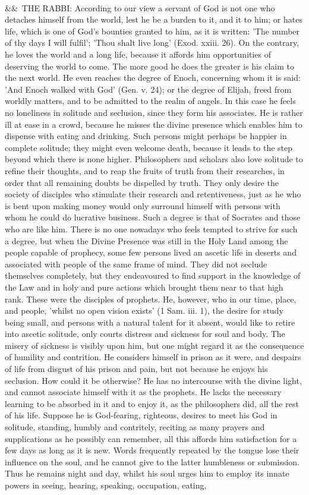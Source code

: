 \documentclass[12pt]{article}
\newcommand{\para}[1][]{\par\noindent\ifx&#1&\else\textsuperscript{\footnotesize #1}~\fi}
\begin{document}
\para THE RABBI: According to our view a servant of God is not one who detaches himself from the world, lest he be a burden to it, and it to him; or hates life, which is one of God's bounties granted to him, as it is written: 'The number of thy days I will fulfil'; 'Thou shalt live long' (Exod. xxiii. 26). On the contrary, he loves the world and a long life, because it affords him opportunities of deserving the world to come. The more good he does the greater is his claim to the next world. He even reaches the degree of Enoch, concerning whom it is said: 'And Enoch walked with God' (Gen. v. 24); or the degree of Elijah, freed from worldly matters, and to be admitted to the realm of angels. In this case he feels no loneliness in solitude and seclusion, since they form his associates. He is rather ill at ease in a crowd, because he misses the divine presence which enables him to dispense with eating and drinking. Such persons might perhaps be happier in complete solitude; they might even welcome death, because it leads to the step beyond which there is none higher. Philosophers and scholars also love solitude to refine their thoughts, and to reap the fruits of truth from their researches, in order that all remaining doubts be dispelled by truth. They only desire the society of disciples who stimulate their research and retentiveness, just as he who is bent upon making money would only surround himself with persons with whom he could do lucrative business. Such a degree is that of Socrates and those who are like him. There is no one nowadays who feels tempted to strive for such a degree, but when the Divine Presence was still in the Holy Land among the people capable of prophecy, some few persons lived an ascetic life in deserts and associated with people of the same frame of mind. They did not seclude themselves completely, but they endeavoured to find support in the knowledge of the Law and in holy and pure actions which brought them near to that high rank. These were the disciples of prophets. He, however, who in our time, place, and people, 'whilst no open vision exists' (1 Sam. iii. 1), the desire for study being small, and persons with a natural talent for it absent, would like to retire into ascetic solitude, only courts distress and sickness for soul and body. The misery of sickness is visibly upon him, but one might regard it as the consequence of humility and contrition. He considers himself in prison as it were, and despairs of life from disgust of his prison and pain, but not because he enjoys his seclusion. How could it be otherwise? He has no intercourse with the divine light, and cannot associate himself with it as the prophets. He lacks the necessary learning to be absorbed in it and to enjoy it, as the philosophers did, all the rest of his life. Suppose he is God-fearing, righteous, desires to meet his God in solitude, standing, humbly and contritely, reciting as many prayers and supplications as he possibly can remember, all this affords him satisfaction for a few days as long as it is new. Words frequently repeated by the tongue lose their influence on the soul, and he cannot give to the latter humbleness or submission. Thus he remains night and day, whilst his soul urges him to employ its innate powers in seeing, hearing, speaking, occupation, eating, 
\end{document}
